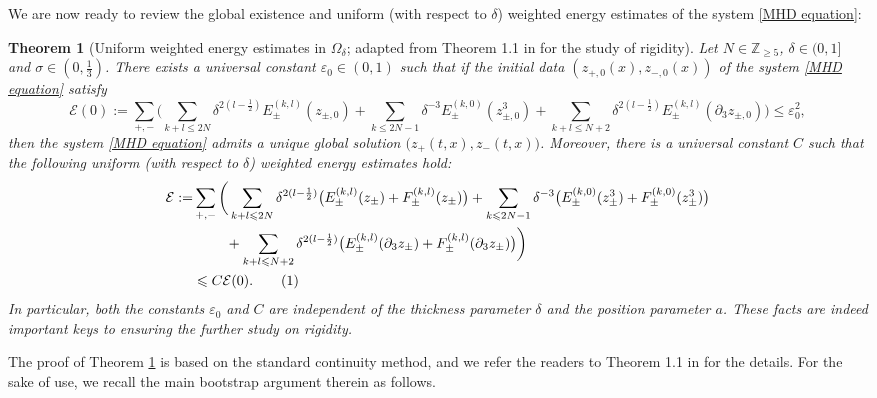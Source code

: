 \documentclass[10pt,reqno]{amsart}
\numberwithin{equation}{section}
\newtheorem{theorem}{Theorem}[section]
\begin{document}
We are now ready to review the global existence and uniform (with respect to $\delta$) weighted energy estimates of the system \eqref{MHD equation}: 
\begin{theorem}[Uniform weighted energy estimates in $\Omega_{\delta}$; adapted from Theorem 1.1 in  \cite{Xu} for the study of rigidity] 
	\label{lemma:global}
	Let $N\in \mathbb{Z}_{\geqslant 5}$, $\delta\in(0,1]$ and  $\sigma\in(0,\frac{1}{3})$.  
	There exists a universal constant $\varepsilon_0\in(0,1)$ such that if the initial data $(z_{+,0}(x),z_{-,0}(x))$ of the system \eqref{MHD equation}  satisfy
	\begin{equation*} 
		\mathcal{E}(0):= 	\sum_{+,-}\bigg(\!\sum_{k+l\leqslant 2N}\!\delta^{2(l-\frac{1}{2})}E_{\pm}^{(k,l)}(z_{\pm,0})	+\!\sum_{k\leqslant 2N-1}\!\delta^{-3}E_{\pm}^{(k,0)}(z_{\pm,0}^3) +\!\sum_{k+l\leqslant N+2}\!\delta^{2(l-\frac{1}{2})}E_{\pm}^{(k,l)}(\partial_3z_{\pm,0})\bigg) \leqslant\varepsilon_0^2,
	\end{equation*}
	then the system \eqref{MHD equation}  admits a unique global  solution $\big(z_+(t,x),z_-(t,x)\big)$. 
	Moreover,  
	there is a universal constant $C$ such that the following  uniform (with respect to $\delta$) weighted energy estimates hold:
	\begin{align*}
		\mathcal{E}:= & \sum_{+,-}\bigg(\sum_{k+l\leqslant 2N}\delta^{2(l-\frac{1}{2})}\big(E_{\pm}^{(k,l)}(z_{\pm})+F_{\pm}^{(k,l)}(z_{\pm})\big)   +\sum_{k\leqslant 2N-1}\delta^{-3}\big(E_{\pm}^{(k,0)}(z_{\pm}^3)+F_{\pm}^{(k,0)}(z_{\pm}^3)\big)\\
		&\ \ \ \ \ \ \  +\sum_{k+l\leqslant N+2}\delta^{2(l-\frac{1}{2})}\big(E_{\pm}^{(k,l)}(\partial_3z_{\pm})+F_{\pm}^{(k,l)}(\partial_3z_{\pm})\big)\bigg)\\
		&\leqslant C\mathcal{E}(0).\stepcounter{equation}\tag{\theequation}\label{eq:estimate}
	\end{align*} 
In particular, both the constants  $\varepsilon_0$ and $C$ are independent of the thickness parameter $\delta$ and the position parameter $a$. These facts are indeed important keys to ensuring the further study on rigidity. 
\end{theorem}

 

The proof of Theorem \ref{lemma:global} is based on the standard continuity method, and 
we refer the readers to Theorem 1.1 in \cite{Xu} for the details.  
For the sake of use, we recall the main bootstrap argument therein as follows.
\end{document}

